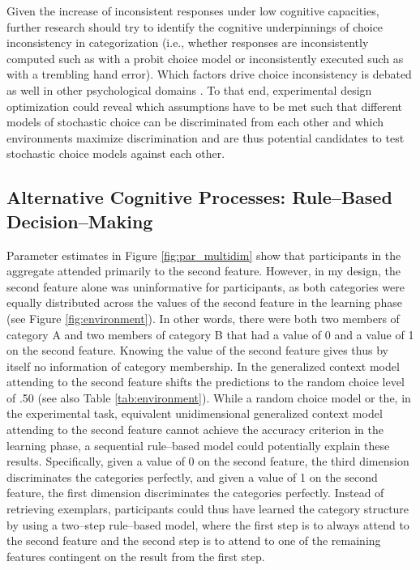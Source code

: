 \documentclass[a4paper,man,natbib]{apa6}
\begin{document}
Given the increase of inconsistent responses under low cognitive capacities, further research should try to identify the cognitive underpinnings of choice inconsistency in categorization (i.e., whether responses are inconsistently computed such as with a probit choice model or inconsistently executed such as with a trembling hand error). Which factors drive choice inconsistency is debated as well in other psychological domains \citep{blavatskyy2010models}. To that end, experimental design optimization \citep{myung2004model} could reveal which assumptions have to be met such that different models of stochastic choice can be discriminated from each other and which environments maximize discrimination and are thus potential candidates to test stochastic choice models against each other.

\subsection{Alternative Cognitive Processes: Rule--Based Decision--Making}
Parameter estimates in Figure \ref{fig:par_multidim} show that participants in the aggregate attended primarily to the second feature. However, in my design, the second feature alone was uninformative for participants, as both categories were equally distributed across the values of the second feature in the learning phase (see Figure \ref{fig:environment}). In other words, there were both two members of category A and two members of category B that had a value of 0 and a value of 1 on the second feature. Knowing the value of the second feature gives thus by itself no information of category membership. In the generalized context model attending to the second feature shifts the predictions to the random choice level of .50 (see also Table \ref{tab:environment}). 
While a random choice model or the, in the experimental task, equivalent unidimensional generalized context model attending to the second feature cannot achieve the accuracy criterion in the learning phase, a sequential rule--based model could potentially explain these results. Specifically, given a value of 0 on the second feature, the third dimension discriminates the categories perfectly, and given a value of 1 on the second feature, the first dimension discriminates the categories perfectly. Instead of retrieving exemplars, participants could thus have learned the category structure by using a two--step rule--based model, where the first step is to always attend to the second feature and the second step is to attend to one of the remaining features contingent on the result from the first step.
\end{document}
